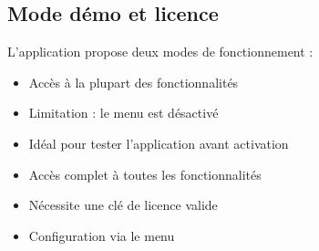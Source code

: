 \subsection{Mode démo et licence}

L'application propose deux modes de fonctionnement :

\begin{description}[leftmargin=3cm]
    \item[Mode démo]
    \begin{itemize}
        \item Accès à la plupart des fonctionnalités
        \item Limitation : le menu  est désactivé
        \item Idéal pour tester l'application avant activation
    \end{itemize}

    \item[Mode activé]
    \begin{itemize}
        \item Accès complet à toutes les fonctionnalités
        \item Nécessite une clé de licence valide
        \item Configuration via le menu 
    \end{itemize}
\end{description}

\newpage
